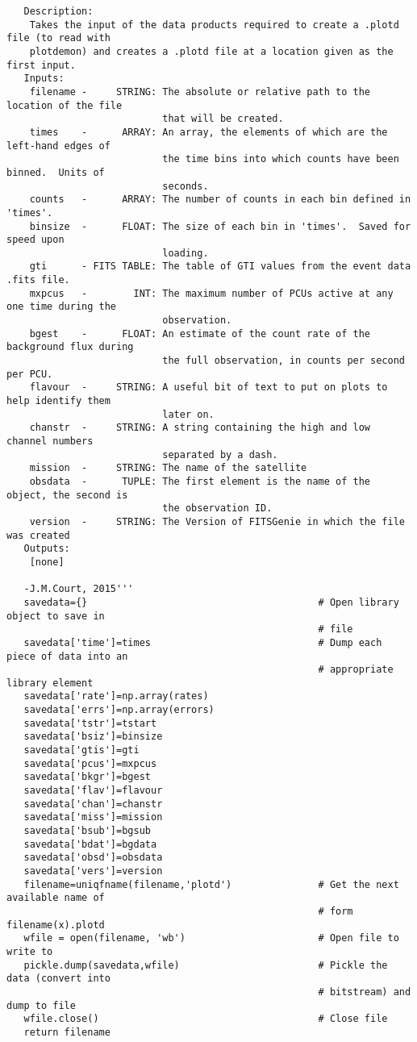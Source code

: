 \begin{verbatim}
   Description:
    Takes the input of the data products required to create a .plotd file (to read with
    plotdemon) and creates a .plotd file at a location given as the first input.
   Inputs:
    filename -     STRING: The absolute or relative path to the location of the file
                           that will be created.
    times    -      ARRAY: An array, the elements of which are the left-hand edges of
                           the time bins into which counts have been binned.  Units of
                           seconds.
    counts   -      ARRAY: The number of counts in each bin defined in 'times'.
    binsize  -      FLOAT: The size of each bin in 'times'.  Saved for speed upon
                           loading.
    gti      - FITS TABLE: The table of GTI values from the event data .fits file.
    mxpcus   -        INT: The maximum number of PCUs active at any one time during the
                           observation.
    bgest    -      FLOAT: An estimate of the count rate of the background flux during
                           the full observation, in counts per second per PCU.
    flavour  -     STRING: A useful bit of text to put on plots to help identify them
                           later on.
    chanstr  -     STRING: A string containing the high and low channel numbers
                           separated by a dash.
    mission  -     STRING: The name of the satellite
    obsdata  -      TUPLE: The first element is the name of the object, the second is
                           the observation ID.
    version  -     STRING: The Version of FITSGenie in which the file was created
   Outputs:
    [none]

   -J.M.Court, 2015'''
   savedata={}                                        # Open library object to save in
                                                      # file
   savedata['time']=times                             # Dump each piece of data into an
                                                      # appropriate library element
   savedata['rate']=np.array(rates)
   savedata['errs']=np.array(errors)
   savedata['tstr']=tstart
   savedata['bsiz']=binsize
   savedata['gtis']=gti
   savedata['pcus']=mxpcus
   savedata['bkgr']=bgest
   savedata['flav']=flavour
   savedata['chan']=chanstr
   savedata['miss']=mission
   savedata['bsub']=bgsub
   savedata['bdat']=bgdata
   savedata['obsd']=obsdata
   savedata['vers']=version
   filename=uniqfname(filename,'plotd')               # Get the next available name of
                                                      # form filename(x).plotd
   wfile = open(filename, 'wb')                       # Open file to write to
   pickle.dump(savedata,wfile)                        # Pickle the data (convert into 
                                                      # bitstream) and dump to file
   wfile.close()                                      # Close file
   return filename


\end{verbatim}
